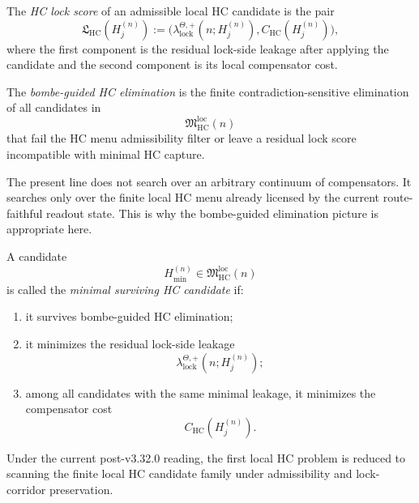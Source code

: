 \begin{definition}
\label{def:hc-lock-score}
The \emph{HC lock score} of an admissible local HC candidate is the pair
\[
  \mathfrak L_{\mathrm{HC}}(H_j^{(n)})
  :=
  \bigl(
    \lambda_{\mathrm{lock}}^{\Theta,+}(n;H_j^{(n)}),
    C_{\mathrm{HC}}(H_j^{(n)})
  \bigr),
\]
where the first component is the residual lock-side leakage after applying the candidate and the second component is its local compensator cost.
\end{definition}

\begin{definition}
\label{def:bombe-guided-hc-elimination}
The \emph{bombe-guided HC elimination} is the finite contradiction-sensitive elimination of all candidates in
\[
  \mathfrak M_{\mathrm{HC}}^{\mathrm{loc}}(n)
\]
that fail the HC menu admissibility filter or leave a residual lock score incompatible with minimal HC capture.
\end{definition}

\begin{remark}
\label{rem:why-the-hc-scan-is-finite}
The present line does not search over an arbitrary continuum of compensators. It searches only over the finite local HC menu already licensed by the current route-faithful readout state. This is why the bombe-guided elimination picture is appropriate here.
\end{remark}

\begin{definition}
\label{def:minimal-surviving-hc-candidate}
A candidate
\[
  H_{\min}^{(n)}\in \mathfrak M_{\mathrm{HC}}^{\mathrm{loc}}(n)
\]
is called the \emph{minimal surviving HC candidate} if:
\begin{enumerate}[leftmargin=2em,label=(\alph*)]
  \item it survives bombe-guided HC elimination;
  \item it minimizes the residual lock-side leakage
  \[
    \lambda_{\mathrm{lock}}^{\Theta,+}(n;H_j^{(n)});
  \]
  \item among all candidates with the same minimal leakage, it minimizes the compensator cost
  \[
    C_{\mathrm{HC}}(H_j^{(n)}).
  \]
\end{enumerate}
\end{definition}

\begin{proposition}
\label{prop:current-line-reduces-hc-to-finite-menu-scan}
Under the current post-v3.32.0 reading, the first local HC problem is reduced to scanning the finite local HC candidate family under admissibility and lock-corridor preservation.
\end{proposition}

